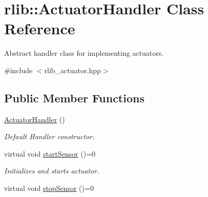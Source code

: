 \hypertarget{classrlib_1_1ActuatorHandler}{\section{rlib\-:\-:Actuator\-Handler Class Reference}
\label{classrlib_1_1ActuatorHandler}
}


Abstract handler class for implementing actuators.  




{\ttfamily \#include $<$rlib\-\_\-actuator.\-hpp$>$}

\subsection*{Public Member Functions}
\begin{DoxyCompactItemize}
\item 
\hypertarget{classrlib_1_1ActuatorHandler_a9f569a4afb19240f02971693c0cc428d}{\hyperlink{classrlib_1_1ActuatorHandler_a9f569a4afb19240f02971693c0cc428d}{Actuator\-Handler} ()}\label{classrlib_1_1ActuatorHandler_a9f569a4afb19240f02971693c0cc428d}

\begin{DoxyCompactList}\small\item\em Default Handler constructor. \end{DoxyCompactList}\item 
\hypertarget{classrlib_1_1ActuatorHandler_a1baacad1bffc427ef593f69cbd9ca7b7}{virtual void \hyperlink{classrlib_1_1ActuatorHandler_a1baacad1bffc427ef593f69cbd9ca7b7}{start\-Sensor} ()=0}\label{classrlib_1_1ActuatorHandler_a1baacad1bffc427ef593f69cbd9ca7b7}

\begin{DoxyCompactList}\small\item\em Initializes and starts actuator. \end{DoxyCompactList}\item 
\hypertarget{classrlib_1_1ActuatorHandler_a5b9557657cd6876b10992e29986592fa}{virtual void \hyperlink{classrlib_1_1ActuatorHandler_a5b9557657cd6876b10992e29986592fa}{stop\-Sensor} ()=0}\label{classrlib_1_1ActuatorHandler_a5b9557657cd6876b10992e29986592fa}


\end{DoxyCompactItemize}
